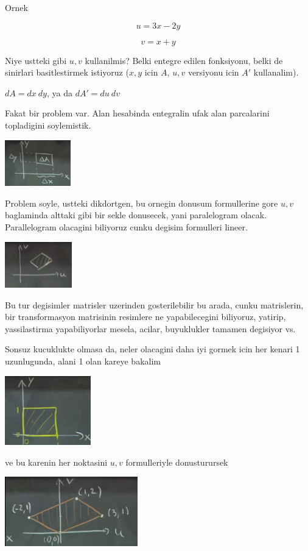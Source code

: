 \documentclass[12pt,fleqn]{article}\usepackage{../common}
\begin{document}
Ornek 

\[ u = 3x - 2y \]

\[ v = x + y \]

Niye ustteki gibi $u,v$ kullanilmis? Belki entegre edilen fonksiyonu, belki
de sinirlari basitlestirmek istiyoruz ($x,y$ icin $A$, $u,v$ versiyonu icin
$A'$ kullanalim). 

$dA = dx \ dy$, ya da $dA' = du \ dv$ 

Fakat bir problem var. Alan hesabinda entegralin ufak alan parcalarini
topladigini soylemistik. 

\includegraphics[height=2cm]{18_2.png}

Problem soyle, ustteki dikdortgen, bu ornegin donusum formullerine gore
$u,v$ baglaminda alttaki gibi bir sekle donusecek, yani paralelogram
olacak. Parallelogram olacagini biliyoruz cunku degisim formulleri
lineer. 

\includegraphics[height=2cm]{18_3.png}

Bu tur degisimler matrisler uzerinden gosterilebilir bu arada, cunku
matrislerin, bir transformasyon matrisinin resimlere ne yapabilecegini
biliyoruz, yatirip, yassilastirma yapabiliyorlar mesela, acilar,
buyuklukler tamamen degisiyor vs. 

Sonsuz kucuklukte olmasa da, neler olacagini daha iyi gormek icin her
kenari 1 uzunlugunda, alani 1 olan kareye bakalim

\includegraphics[height=3cm]{18_4.png}

ve bu karenin her noktasini $u,v$ formulleriyle donusturursek

\includegraphics[height=3cm]{18_5.png}
\end{document}
